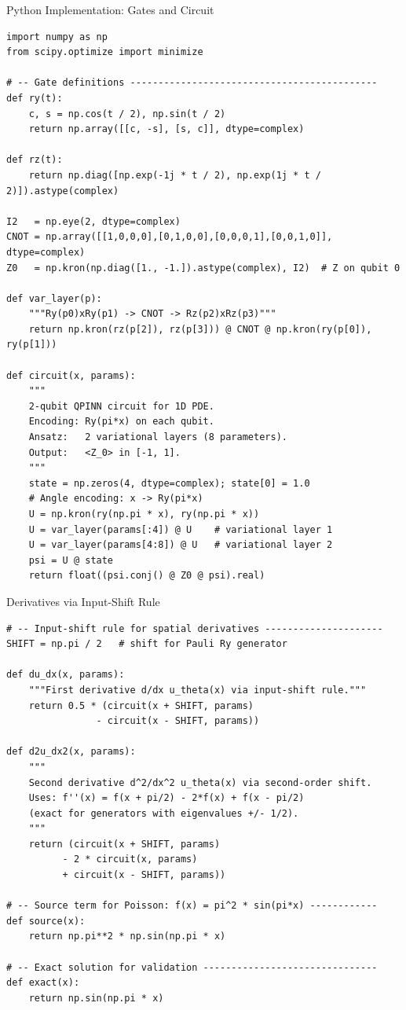 \documentclass[aspectratio=169,10pt]{beamer}
\begin{document}
\begin{frame}[fragile]{Python Implementation: Gates and Circuit}
  \begin{lstlisting}
import numpy as np
from scipy.optimize import minimize

# -- Gate definitions --------------------------------------------
def ry(t):
    c, s = np.cos(t / 2), np.sin(t / 2)
    return np.array([[c, -s], [s, c]], dtype=complex)

def rz(t):
    return np.diag([np.exp(-1j * t / 2), np.exp(1j * t / 2)]).astype(complex)

I2   = np.eye(2, dtype=complex)
CNOT = np.array([[1,0,0,0],[0,1,0,0],[0,0,0,1],[0,0,1,0]], dtype=complex)
Z0   = np.kron(np.diag([1., -1.]).astype(complex), I2)  # Z on qubit 0

def var_layer(p):
    """Ry(p0)xRy(p1) -> CNOT -> Rz(p2)xRz(p3)"""
    return np.kron(rz(p[2]), rz(p[3])) @ CNOT @ np.kron(ry(p[0]), ry(p[1]))

def circuit(x, params):
    """
    2-qubit QPINN circuit for 1D PDE.
    Encoding: Ry(pi*x) on each qubit.
    Ansatz:   2 variational layers (8 parameters).
    Output:   <Z_0> in [-1, 1].
    """
    state = np.zeros(4, dtype=complex); state[0] = 1.0
    # Angle encoding: x -> Ry(pi*x)
    U = np.kron(ry(np.pi * x), ry(np.pi * x))
    U = var_layer(params[:4]) @ U    # variational layer 1
    U = var_layer(params[4:8]) @ U   # variational layer 2
    psi = U @ state
    return float((psi.conj() @ Z0 @ psi).real)
  \end{lstlisting}
\end{frame}

\begin{frame}[fragile]{Derivatives via Input-Shift Rule}
  \begin{lstlisting}
# -- Input-shift rule for spatial derivatives ---------------------
SHIFT = np.pi / 2   # shift for Pauli Ry generator

def du_dx(x, params):
    """First derivative d/dx u_theta(x) via input-shift rule."""
    return 0.5 * (circuit(x + SHIFT, params)
                - circuit(x - SHIFT, params))

def d2u_dx2(x, params):
    """
    Second derivative d^2/dx^2 u_theta(x) via second-order shift.
    Uses: f''(x) = f(x + pi/2) - 2*f(x) + f(x - pi/2)
    (exact for generators with eigenvalues +/- 1/2).
    """
    return (circuit(x + SHIFT, params)
          - 2 * circuit(x, params)
          + circuit(x - SHIFT, params))

# -- Source term for Poisson: f(x) = pi^2 * sin(pi*x) ------------
def source(x):
    return np.pi**2 * np.sin(np.pi * x)

# -- Exact solution for validation -------------------------------
def exact(x):
    return np.sin(np.pi * x)
  \end{lstlisting}
\end{frame}
\end{document}
